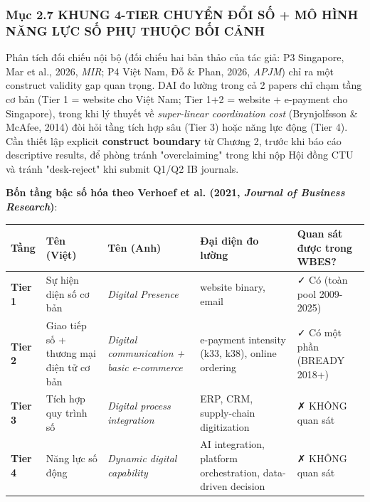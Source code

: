 \documentclass[12pt,a4paper]{article}
\begin{document}
\hypertarget{mux1ee5c-27-khung-4-tier-chuyux1ec3n-ux111ux1ed5i-sux1ed1--muxf4-huxecnh-nux103ng-lux1ef1c-sux1ed1-phux1ee5-thuux1ed9c-bux1ed1i-cux1ea3nh}{%
\subsubsection{Mục 2.7 KHUNG 4-TIER CHUYỂN ĐỔI SỐ + MÔ HÌNH NĂNG LỰC SỐ
PHỤ THUỘC BỐI
CẢNH}\label{mux1ee5c-27-khung-4-tier-chuyux1ec3n-ux111ux1ed5i-sux1ed1--muxf4-huxecnh-nux103ng-lux1ef1c-sux1ed1-phux1ee5-thuux1ed9c-bux1ed1i-cux1ea3nh}}

Phân tích đối chiếu nội bộ (đối chiếu hai bản thảo của tác giả: P3
Singapore, Mar et al., 2026, \emph{MIR}; P4 Việt Nam, Đỗ \& Phan, 2026,
\emph{APJM}) chỉ ra một construct validity gap quan trọng. DAI đo lường
trong cả 2 papers chỉ chạm tầng cơ bản (Tier 1 = website cho Việt Nam;
Tier 1+2 = website + e-payment cho Singapore), trong khi lý thuyết về
\emph{super-linear coordination cost} (Brynjolfsson \& McAfee, 2014) đòi
hỏi tầng tích hợp sâu (Tier 3) hoặc năng lực động (Tier 4). Cần thiết
lập explicit \textbf{construct boundary} từ Chương 2, trước khi báo cáo
descriptive results, để phòng tránh "overclaiming" trong khi nộp Hội
đồng CTU và tránh "desk-reject" khi submit Q1/Q2 IB journals.

\textbf{Bốn tầng bậc số hóa theo Verhoef et al. (2021, \emph{Journal of
Business Research})}:

\begin{longtable}[]{@{}lllll@{}}
\toprule\noalign{}
Tầng & Tên (Việt) & Tên (Anh) & Đại diện đo lường & Quan sát được trong
WBES? \\
\midrule\noalign{}
\endhead
\bottomrule\noalign{}
\endlastfoot
\textbf{Tier 1} & Sự hiện diện số cơ bản & \emph{Digital Presence} &
website binary, email & ✓ Có (toàn pool 2009-2025) \\
\textbf{Tier 2} & Giao tiếp số + thương mại điện tử cơ bản &
\emph{Digital communication + basic e-commerce} & e-payment intensity
(k33, k38), online ordering & ✓ Có một phần (BREADY 2018+) \\
\textbf{Tier 3} & Tích hợp quy trình số & \emph{Digital process
integration} & ERP, CRM, supply-chain digitization & ✗ KHÔNG quan sát \\
\textbf{Tier 4} & Năng lực số động & \emph{Dynamic digital capability} &
AI integration, platform orchestration, data-driven decision & ✗ KHÔNG
quan sát \\
\end{longtable}
\end{document}
